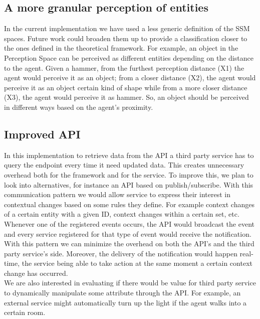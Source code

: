 \subsection{A more granular perception of entities}
In the current implementation we have used a less generic definition of the SSM spaces. Future work could broaden them up to provide a classification closer to the ones defined in the theoretical framework. For example, an object in the Perception Space can be perceived as different entities depending on the distance to the agent. Given a hammer, from the furthest perception distance (X1) the agent would perceive it as an object; from a closer distance (X2), the agent would perceive it as an object certain kind of shape while from a more closer distance (X3), the agent would perceive it as hammer. So, an object should be perceived in different ways based on the agent's proximity.

\subsection{Improved API}
In this implementation to retrieve data from the API a third party service has to query the endpoint every time it need updated data. This creates unnecessary overhead both for the framework and for the service. To improve this, we plan to look into alternatives, for instance an API based on publish/subscribe. With this communication pattern we would allow service to express their interest in contextual changes based on some rules they define. For example context changes of a certain entity with a given ID, context changes within a certain set, etc. Whenever one of the registered events occurs, the API would broadcast the event and every service registered for that type of event would receive the notification. With this pattern we can minimize the overhead on both the API's and the third party service's side. Moreover, the delivery of the notification would happen real-time, the service being able to take action at the same moment a certain context change has occurred.\\

We are also interested in evaluating if there would be value for third party service to dynamically manipulate some attribute through the API. For example, an external service might automatically turn up the light if the agent walks into a certain room.

